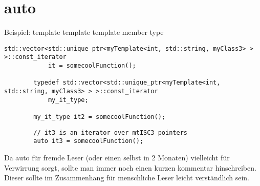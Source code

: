 \section{auto}

\begin{frame}[fragile]{Beispiel: template template template member type}
	\begin{lstlisting}[basicstyle=\tiny]
		std::vector<std::unique_ptr<myTemplate<int, std::string, myClass3> > >::const_iterator
		    it = somecoolFunction();
		
		typedef std::vector<std::unique_ptr<myTemplate<int, std::string, myClass3> > >::const_iterator 
		    my_it_type;
		    
		my_it_type it2 = somecoolFunction();
	\end{lstlisting}
	\begin{lstlisting}
		// it3 is an iterator over mtISC3 pointers
		auto it3 = somecoolFunction();
	\end{lstlisting}
	Da auto für fremde Leser (oder einen selbst in 2 Monaten) vielleicht für Verwirrung sorgt, sollte man immer noch einen kurzen kommentar hinschreiben.
	Dieser sollte im Zusammenhang für menschliche Leser leicht verständlich sein.
\end{frame}
